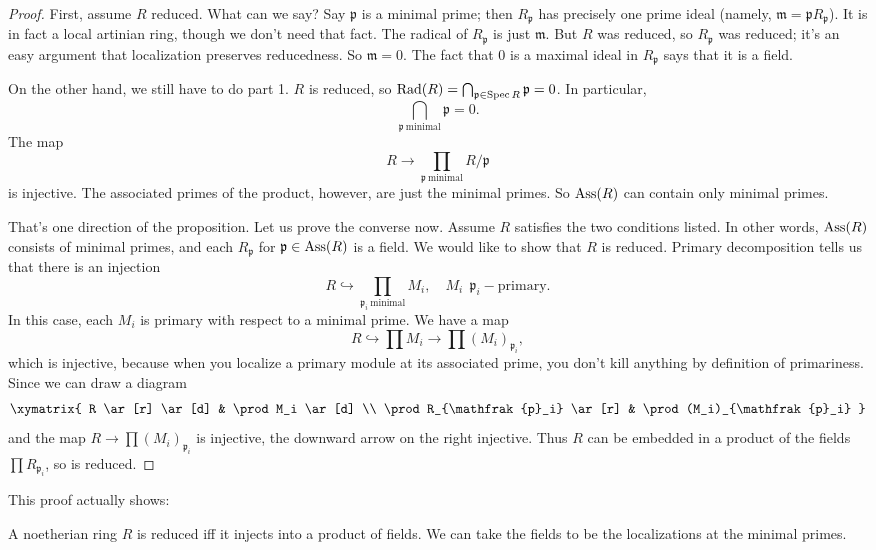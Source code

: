 \begin{proof}
First, assume $R$ reduced. What can we say? Say $\mathfrak{p}$ is a minimal
prime; then $R_{\mathfrak{p}}$ has precisely one prime ideal (namely,
$\mathfrak{m}=\mathfrak{p}R_{\mathfrak{p}}$). It is in fact a local artinian
ring, though we
don't need that fact. The radical of $R_{\mathfrak{p}}$ is just $\mathfrak{m}$.
But $R$ was reduced, so $R_{\mathfrak{p}}$ was reduced; it's an easy argument
that localization preserves reducedness. So $\mathfrak{m}=0$. The fact that 0
is a maximal ideal in $R_{\mathfrak{p}}$ says that it is a field.

On the other hand, we still have to do part 1. $R$ is reduced, so $\operatorname{Rad}(R) =
\bigcap_{\mathfrak{p} \in \operatorname{Spec} R} \mathfrak{p} = 0$. In particular,
\[ \bigcap_{\mathfrak{p} \ \mathrm{minimal}}\mathfrak{p} = 0.  \]
The map
\[ R \to \prod_{\mathfrak{p} \ \mathrm{minimal}}R/\mathfrak{p}	\]
is injective. The associated primes of the product, however, are just the
minimal primes. So $\operatorname{Ass}(R)$ can contain only minimal primes.

That's one direction of the proposition. Let us prove the converse now. Assume
$R$ satisfies the two conditions listed. In other words, $\operatorname{Ass}(R)$ consists of
minimal primes, and each $R_{\mathfrak{p}}$ for $\mathfrak{p} \in \operatorname{Ass}(R)$ is a
field. We would like to show that $R$ is reduced.
Primary decomposition tells us that there is an injection
\[ R \hookrightarrow \prod_{\mathfrak{p}_i \ \mathrm{minimal}} M_i, \quad M_i
\ \  \mathfrak{p}_i-\mathrm{primary}. \]
In this case, each $M_i$ is primary with respect to a minimal prime. We have a
map
\[ R \hookrightarrow \prod M_i \to \prod (M_i)_{\mathfrak{p}_i},  \]
which is injective, because when you localize a primary module at its
associated prime, you don't kill anything by definition of primariness. Since
we can draw a diagram
\[
\xymatrix{
R \ar[r] \ar[d]  &  \prod M_i \ar[d]  \\
\prod R_{\mathfrak{p}_i} \ar[r] & \prod (M_i)_{\mathfrak{p}_i}
}
\]
and the map $R \to \prod (M_i)_{\mathfrak{p}_i}$ is injective, the downward
arrow on the right injective. Thus $R$ can be embedded in
a product of the fields $\prod R_{\mathfrak{p}_i}$, so is reduced.
\end{proof}

This proof actually shows:
\begin{proposition}[Scholism] A noetherian ring $R$ is reduced iff it injects
into a product of fields. We can take the fields to be the localizations at the
minimal primes.
\end{proposition}

